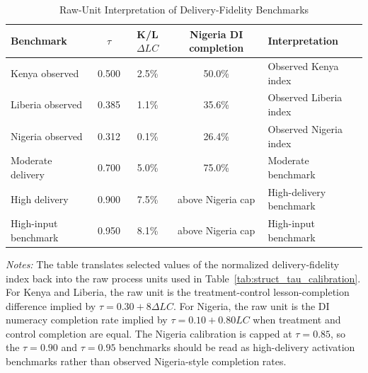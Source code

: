 \begin{table}[H]
\centering
\caption{Raw-Unit Interpretation of Delivery-Fidelity Benchmarks}
\label{tab:struct_tau_raw_thresholds}
\begin{threeparttable}
\scriptsize
\setlength{\tabcolsep}{3pt}
\begin{tabular}[t]{>{\raggedright\arraybackslash}p{2.6cm}ccc>{\raggedright\arraybackslash}p{3.1cm}}
\toprule
Benchmark & $\tau$ & K/L $\Delta LC$ & Nigeria DI completion & Interpretation \\
\midrule
Kenya observed & 0.500 & 2.5\% & 50.0\% & Observed Kenya index \\
Liberia observed & 0.385 & 1.1\% & 35.6\% & Observed Liberia index \\
Nigeria observed & 0.312 & 0.1\% & 26.4\% & Observed Nigeria index \\
Moderate delivery & 0.700 & 5.0\% & 75.0\% & Moderate benchmark \\
High delivery & 0.900 & 7.5\% & above Nigeria cap & High-delivery benchmark \\
High-input benchmark & 0.950 & 8.1\% & above Nigeria cap & High-input benchmark \\
\bottomrule
\end{tabular}
\begin{tablenotes}
\footnotesize
\item \textit{Notes:} The table translates selected values of the normalized delivery-fidelity index back into the raw process units used in Table~\ref{tab:struct_tau_calibration}. For Kenya and Liberia, the raw unit is the treatment-control lesson-completion difference implied by $\tau=0.30+8\Delta LC$. For Nigeria, the raw unit is the DI numeracy completion rate implied by $\tau=0.10+0.80LC$ when treatment and control completion are equal. The Nigeria calibration is capped at $\tau=0.85$, so the $\tau=0.90$ and $\tau=0.95$ benchmarks should be read as high-delivery activation benchmarks rather than observed Nigeria-style completion rates.
\end{tablenotes}
\end{threeparttable}
\end{table}
